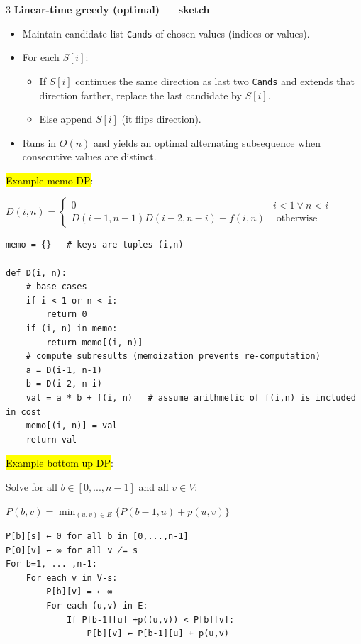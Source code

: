 \documentclass[letterpaper]{article}
\begin{document}
\begin{multicols*}{3}
    \textbf{Linear-time greedy (optimal) — sketch}
    \begin{itemize}[noitemsep]
        \item Maintain candidate list \texttt{Cands} of chosen values (indices or values).
        \item For each $S[i]$:
              \begin{itemize}[noitemsep]
                  \item If $S[i]$ continues the same direction as last two \texttt{Cands} and extends that direction farther, replace the last candidate by $S[i]$.
                  \item Else append $S[i]$ (it flips direction).
              \end{itemize}
        \item Runs in $O(n)$ and yields an optimal alternating subsequence when consecutive values are distinct.
    \end{itemize}

    \hl{Example memo DP}:

    $D(i,n)=\begin{cases}0&i<1\lor n<i\\D(i-1,n-1)D(i-2,n-i)+f(i,n)&\text{ otherwise }\end{cases}$

    \begin{verbatim}
memo = {}   # keys are tuples (i,n)

def D(i, n):
    # base cases
    if i < 1 or n < i:
        return 0
    if (i, n) in memo:
        return memo[(i, n)]
    # compute subresults (memoization prevents re-computation)
    a = D(i-1, n-1)
    b = D(i-2, n-i)
    val = a * b + f(i, n)   # assume arithmetic of f(i,n) is included in cost
    memo[(i, n)] = val
    return val
    \end{verbatim}

    \hl{Example bottom up DP}:

    Solve for all $b \in [0,...,n-1]$ and all $v \in V$:

    $P(b,v)=\min_{(u,v)\in E}\{P(b-1,u)+p(u,v)\}$

    \begin{verbatim}
P[b][s] ← 0 for all b in [0,...,n-1] 
P[0][v] ← ∞ for all v ̸= s 
For b=1, ... ,n-1: 
    For each v in V-s: 
        P[b][v] = ← ∞ 
        For each (u,v) in E: 
            If P[b-1][u] +p((u,v)) < P[b][v]: 
                P[b][v] ← P[b-1][u] + p(u,v)
    \end{verbatim}


\end{multicols*}
\end{document}
